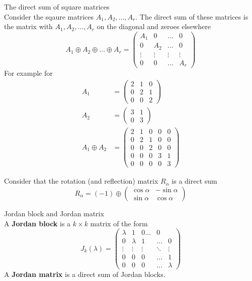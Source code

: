 \documentclass[journal, letterpaper]{IEEEtran}
\begin{document}
    \begin{myboxr}{The direct sum of square matrices} \\
        Consider the sqaure matrices $A_1, A_2, \dots, A_r$. The direct sum of these matrices is the matrix 
        with $A_1, A_2, \dots, A_r$ on the diagonal and zeroes elsewhere
        $$
        A_1 \oplus A_2 \oplus \dots \oplus A_r = \begin{pmatrix}
            A_1 & 0 & \dots & 0 \\ 0 & A_2 & \dots & 0 \\ \vdots & \vdots & \vdots & \vdots \\ 
            0 & 0 & \dots & A_r
        \end{pmatrix}
        $$
        For example for 
        \begin{align*}
            A_1 &= \begin{pmatrix}
                2 & 1 & 0 \\ 0 & 2 & 1 \\ 0 & 0 & 2
            \end{pmatrix} \\ 
            A_2 &= \begin{pmatrix}
                3 & 1 \\ 0 & 3
            \end{pmatrix} \\ 
            A_1 \oplus A_2 &= \begin{pmatrix}
                2 & 1 & 0 & 0 & 0 \\ 0 & 2 & 1 & 0 & 0 \\ 0 & 0 & 2 & 0 & 0 \\ 0 & 0 & 0 & 3 & 1 \\ 
                0 & 0 & 0 & 0 & 3
            \end{pmatrix}
        \end{align*}
    \end{myboxr}
    Consider that the rotation (and reflection) matrix $R_\alpha$ is a direct sum 
    $$ R_\alpha = (-1) \oplus \begin{pmatrix}
        \cos\alpha & -\sin\alpha \\ \sin\alpha & \cos\alpha
    \end{pmatrix} $$
    \begin{mybox}{Jordan block and Jordan matrix} \\
        A \textbf{Jordan block} is a $k\times k$ matrix of the form
        $$ J_k(\lambda) = \begin{pmatrix}
            \lambda & 1 & 0 \dots & 0 \\
            0 & \lambda & 1 & \dots & 0 \\ 
            \vdots & \vdots & \vdots & \ddots & \vdots \\ 
            0 & 0 & 0 & \dots & 1 \\
            0 & 0 & 0 & \dots & \lambda
        \end{pmatrix}$$
        A \textbf{Jordan matrix} is a direct sum of Jordan blocks.
    \end{mybox}
\end{document}
